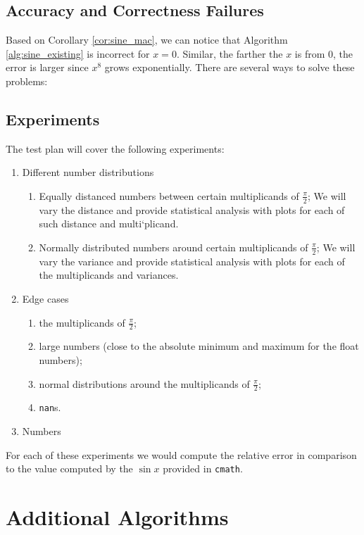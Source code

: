 \documentclass[12pt]{article}
\begin{document}
\subsection{Accuracy and Correctness Failures} \label{subsec:acc_and_corr}
Based on Corollary \ref{cor:sine_mac}, we can notice that Algorithm \ref{alg:sine_existing} is incorrect for $x = 0$.
Similar, the farther the $x$ is from 0, the error is larger since $x^8$ grows exponentially.
There are several ways to solve these problems:

\subsection{Experiments}


The test plan will cover the following experiments:
\begin{enumerate}
    \item Different number distributions
    \begin{enumerate}
        \item Equally distanced numbers between certain multiplicands of $\frac{\pi}{2}$; We will vary the distance and provide statistical analysis with plots for each of such distance and multi`plicand.
        \item Normally distributed numbers around certain multiplicands of $\frac{\pi}{2}$; We will vary the variance and provide statistical analysis with plots for each of the multiplicands and variances.
    \end{enumerate}
    \item Edge cases
        \begin{enumerate}
            \item the multiplicands of $\frac{\pi}{2}$;
            \item large numbers (close to the absolute minimum  and maximum for the float numbers);
            \item normal distributions around the multiplicands of $\frac{\pi}{2}$;
            \item \texttt{nan}s.
        \end{enumerate}
    \item Numbers
\end{enumerate}
For each of these experiments we would compute the relative error in comparison to the value computed by the $\sin x$ provided in \texttt{cmath}.
\newpage
\section{Additional Algorithms}
\end{document}
